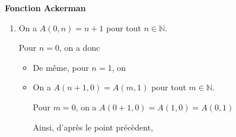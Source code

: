 
\ifdefined\COMPLETE
\else
    
\usepackage{diagbox}
    
\fi


\centerline{\huge \bf Fonction Ackerman}

\bigskip

\begin{enumerate}


\item On a $A(0,n) = n+1$ pour tout $n \in \mathbb{N}$.

Pour $n=0$, on a donc 

\begin{itemize}
\item De même, pour  $n=1$, on  

\item On a $A(n+1,0) = A(m,1)$  pour tout  $m \in \mathbb{N}$.

Pour  $m=0$, on a $A(0+1,0) = A(1, 0) = A(0,1)$

Ainsi, d'après le point précèdent, 
\end{itemize} 

\bigskip 


\end{enumerate}
